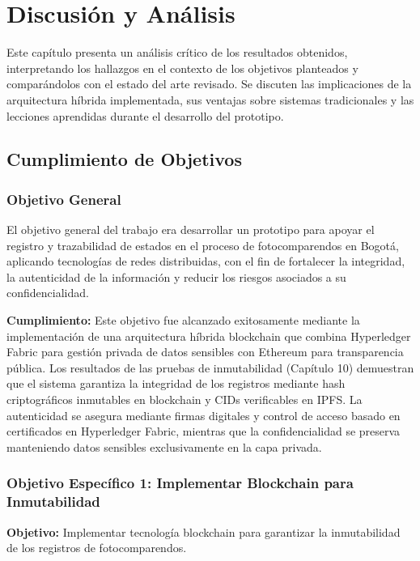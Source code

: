 \section{Discusión y Análisis}

Este capítulo presenta un análisis crítico de los resultados obtenidos, interpretando los hallazgos en el contexto de los objetivos planteados y comparándolos con el estado del arte revisado. Se discuten las implicaciones de la arquitectura híbrida implementada, sus ventajas sobre sistemas tradicionales y las lecciones aprendidas durante el desarrollo del prototipo.

\subsection{Cumplimiento de Objetivos}

\subsubsection{Objetivo General}

El objetivo general del trabajo era desarrollar un prototipo para apoyar el registro y trazabilidad de estados en el proceso de fotocomparendos en Bogotá, aplicando tecnologías de redes distribuidas, con el fin de fortalecer la integridad, la autenticidad de la información y reducir los riesgos asociados a su confidencialidad.

\textbf{Cumplimiento:} Este objetivo fue alcanzado exitosamente mediante la implementación de una arquitectura híbrida blockchain que combina Hyperledger Fabric para gestión privada de datos sensibles con Ethereum para transparencia pública. Los resultados de las pruebas de inmutabilidad (Capítulo 10) demuestran que el sistema garantiza la integridad de los registros mediante hash criptográficos inmutables en blockchain y CIDs verificables en IPFS. La autenticidad se asegura mediante firmas digitales y control de acceso basado en certificados en Hyperledger Fabric, mientras que la confidencialidad se preserva manteniendo datos sensibles exclusivamente en la capa privada.

\subsubsection{Objetivo Específico 1: Implementar Blockchain para Inmutabilidad}

\textbf{Objetivo:} Implementar tecnología blockchain para garantizar la inmutabilidad de los registros de fotocomparendos.

